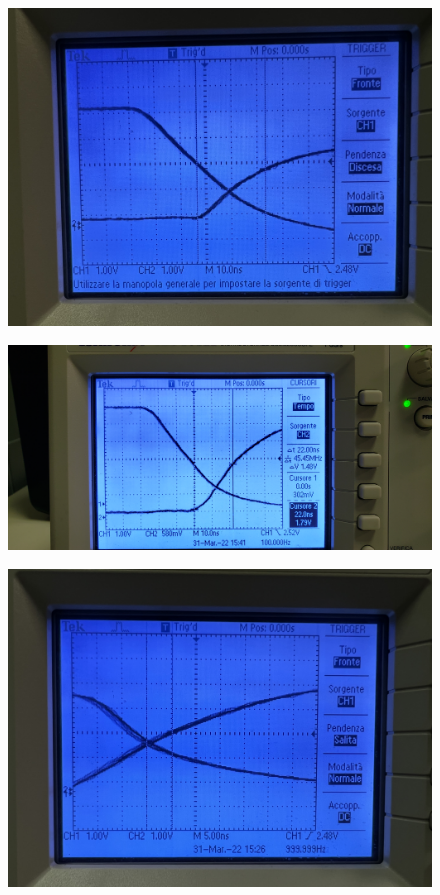 \documentclass[10pt, a4paper, italian]{article}
\begin{document}
\begin{figure}
	\includegraphics[width=\textwidth]{LH2}
\end{figure}
\begin{figure}
	\includegraphics[width=\textwidth]{HL1}
\end{figure}
\begin{figure}
	\includegraphics[width=\textwidth]{HL2}
\end{figure}
\end{document}
